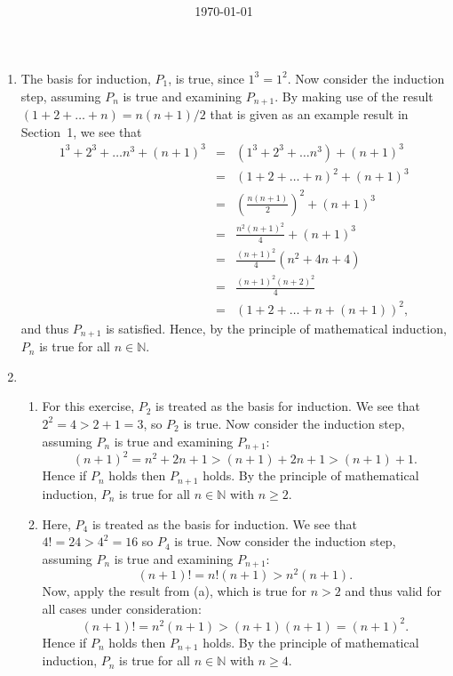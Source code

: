 \documentclass[12pt,letterpaper]{article}
\title{\vspace{-90pt} \course  \hw \\\author{\name}\date{\today}}
\newcommand{\N}{\mathbb{N}}
\begin{document}
	\maketitle



\begin{enumerate}
  \item The basis for induction, $P_1$, is true, since $1^3=1^2$. Now consider
    the induction step, assuming $P_n$ is true and examining $P_{n+1}$. By
    making use of the result $(1+2+\ldots+n) = n(n+1)/2$ that is given as an
    example result in Section~1, we see that
    \begin{eqnarray*}
      1^3 + 2^3 + \ldots n^3 + (n+1)^3 &=& (1^3 + 2^3 + \ldots n^3) + (n+1)^3 \\
      &=& (1+2+ \ldots + n)^2 + (n+1)^3 \\
      &=& \left(\frac{n(n+1)}{2}\right)^2 + (n+1)^3 \\
      &=& \frac{n^2(n+1)^2}{4} + (n+1)^3 \\
      &=& \frac{(n+1)^2}{4} \left( n^2 + 4n+4 \right) \\
      &=& \frac{(n+1)^2(n+2)^2}{4} \\
      &=& (1+2+\ldots + n + (n+1))^2,
    \end{eqnarray*}
    and thus $P_{n+1}$ is satisfied. Hence, by the principle of mathematical
    induction, $P_n$ is true for all $n\in \N$.
  \item
    \begin{enumerate}
      \item For this exercise, $P_2$ is treated as the basis for induction. We
	see that $2^2 = 4 > 2+1=3$, so $P_2$ is true. Now consider the
	induction step, assuming $P_n$ is true and examining $P_{n+1}$:
	\[
	(n+1)^2 = n^2+2n+1 >(n+1)+ 2n+1 > (n+1) +1.
	\]
	Hence if $P_n$ holds then $P_{n+1}$ holds. By the principle of
	mathematical induction, $P_n$ is true for all $n\in \N$ with $n \ge 2$.
      \item Here, $P_4$ is treated as the basis for induction. We see that $4!
	= 24 > 4^2=16$ so $P_4$ is true. Now consider the induction step,
	assuming $P_n$ is true and examining $P_{n+1}$:
	\[
	(n+1)! = n! (n+1) > n^2 (n+1).
	\]
	Now, apply the result from (a), which is true for $n>2$ and thus valid
	for all cases under consideration:
	\[
	(n+1)! = n^2 (n+1) > (n+1)(n+1) = (n+1)^2.
	\]
	Hence if $P_n$ holds then $P_{n+1}$ holds. By the principle of
	mathematical induction, $P_n$ is true for all $n\in \N$ with $n \ge 4$.
    \end{enumerate}

\end{enumerate}
\end{document}
